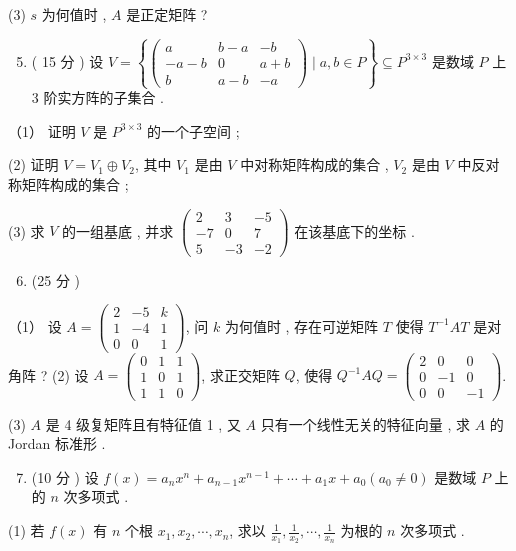 \documentclass[10pt]{article}
\begin{document}
{(3) $s$  为何值时 , $A$  是正定矩阵 ?

\begin{enumerate}
  \setcounter{enumi}{4}
  \item ( 15  分 )  设  $V=\left\{\left(\begin{array}{ccc}a & b-a & -b \\ -a-b & 0 & a+b \\ b & a-b & -a\end{array}\right) \mid a, b \in P\right\} \subseteq P^{3 \times 3}$  是数域  $P$  上  3  阶实方阵的子集合 .
\end{enumerate}
（1）  证明  $V$  是  $P^{3 \times 3}$  的一个子空间 ;

(2)  证明  $V=V_{1} \oplus V_{2}$,  其中  $V_{1}$  是由  $V$  中对称矩阵构成的集合 , $V_{2}$  是由  $V$  中反对称矩阵构成的集合 ;

(3)  求  $V$  的一组基底 ,  并求  $\left(\begin{array}{ccc}2 & 3 & -5 \\ -7 & 0 & 7 \\ 5 & -3 & -2\end{array}\right)$  在该基底下的坐标 .

\begin{enumerate}
  \setcounter{enumi}{5}
  \item (25  分 )
\end{enumerate}
（1） 设  $A=\left(\begin{array}{ccc}2 & -5 & k \\ 1 & -4 & 1 \\ 0 & 0 & 1\end{array}\right)$,  问  $k$  为何值时 ,  存在可逆矩阵  $T$  使得  $T^{-1} A T$  是对角阵 ? (2)  设  $A=\left(\begin{array}{ccc}0 & 1 & 1 \\ 1 & 0 & 1 \\ 1 & 1 & 0\end{array}\right)$,  求正交矩阵  $Q$,  使得  $Q^{-1} A Q=\left(\begin{array}{ccc}2 & 0 & 0 \\ 0 & -1 & 0 \\ 0 & 0 & -1\end{array}\right)$.

(3) $A$  是  4  级复矩阵且有特征值  1 ,  又  $A$  只有一个线性无关的特征向量 ,  求  $A$  的  Jordan  标准形 .

\begin{enumerate}
  \setcounter{enumi}{6}
  \item (10  分 )  设  $f(x)=a_{n} x^{n}+a_{n-1} x^{n-1}+\cdots+a_{1} x+a_{0}\left(a_{0} \neq 0\right)$  是数域  $P$  上的  $n$  次多项式 .
\end{enumerate}
(1)  若  $f(x)$  有  $n$  个根  $x_{1}, x_{2}, \cdots, x_{n}$,  求以  $\frac{1}{x_{1}}, \frac{1}{x_{2}}, \cdots, \frac{1}{x_{n}}$  为根的  $n$  次多项式 .

}
\end{document}

